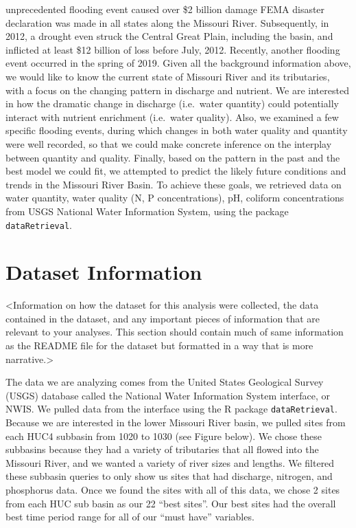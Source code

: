 \documentclass[12pt,]{article}
\begin{document}
unprecedented flooding event caused over \$2 billion damage FEMA
disaster declaration was made in all states along the Missouri River.
Subsequently, in 2012, a drought even struck the Central Great Plain,
including the basin, and inflicted at least \$12 billion of loss before
July, 2012. Recently, another flooding event occurred in the spring of
2019. Given all the background information above, we would like to know
the current state of Missouri River and its tributaries, with a focus on
the changing pattern in discharge and nutrient. We are interested in how
the dramatic change in discharge (i.e.~water quantity) could potentially
interact with nutrient enrichment (i.e.~water quality). Also, we
examined a few specific flooding events, during which changes in both
water quality and quantity were well recorded, so that we could make
concrete inference on the interplay between quantity and quality.
Finally, based on the pattern in the past and the best model we could
fit, we attempted to predict the likely future conditions and trends in
the Missouri River Basin. To achieve these goals, we retrieved data on
water quantity, water quality (N, P concentrations), pH, coliform
concentrations from USGS National Water Information System, using the
package \texttt{dataRetrieval}.

\newpage

\hypertarget{dataset-information}{%
\section{Dataset Information}\label{dataset-information}}

\textless{}Information on how the dataset for this analysis were
collected, the data contained in the dataset, and any important pieces
of information that are relevant to your analyses. This section should
contain much of same information as the README file for the dataset but
formatted in a way that is more narrative.\textgreater{}

The data we are analyzing comes from the United States Geological Survey
(USGS) database called the National Water Information System interface,
or NWIS. We pulled data from the interface using the R package
\texttt{dataRetrieval}. Because we are interested in the lower Missouri
River basin, we pulled sites from each HUC4 subbasin from 1020 to 1030
(see Figure below). We chose these subbasins because they had a variety
of tributaries that all flowed into the Missouri River, and we wanted a
variety of river sizes and lengths. We filtered these subbasin queries
to only show us sites that had discharge, nitrogen, and phosphorus data.
Once we found the sites with all of this data, we chose 2 sites from
each HUC sub basin as our 22 ``best sites''. Our best sites had the
overall best time period range for all of our ``must have'' variables.
\end{document}
